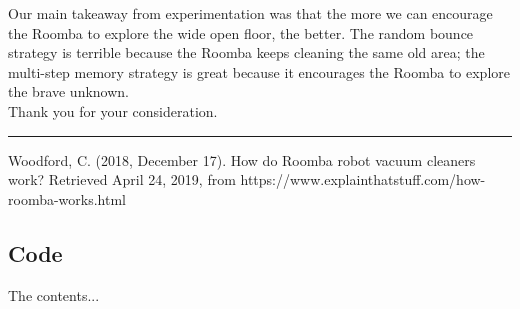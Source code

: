 \documentclass[11pt]{article}
\begin{document}
Our main takeaway from experimentation was that the more we can
encourage the Roomba to explore the wide open floor, the better. The
random bounce strategy is terrible because the Roomba keeps cleaning the
same old area; the multi-step memory strategy is great because it
encourages the Roomba to explore the brave unknown.\\

Thank you for your consideration.

\rule{\textwidth}{0.4pt}


\begin{thebibliography}{9}
Woodford, C. (2018, December 17). How do Roomba robot vacuum cleaners
work? Retrieved April 24, 2019, from
https://www.explainthatstuff.com/how-roomba-works.html
\end{thebibliography}

\begin{appendices}
\chapter{Code}
The contents...
\end{appendices}


    
    
    
    
\end{document}
